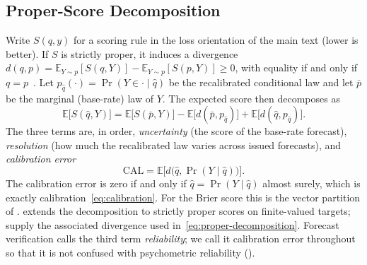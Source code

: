 \subsection{Proper-Score Decomposition}
Write $S(q,y)$ for a scoring rule in the loss orientation of the main text (lower is better).
If $S$ is strictly proper, it induces a divergence $d(q,p)=\mathbb{E}_{Y\sim p}[S(q,Y)]-\mathbb{E}_{Y\sim p}[S(p,Y)]\ge 0$, with equality if and only if $q=p$~\citep{gneiting2007strictly}.
Let $p_{\hat q}(\cdot)=\Pr(Y\in\cdot\mid\hat q)$ be the recalibrated conditional law and let $\bar p$ be the marginal (base-rate) law of $Y$.
The expected score then decomposes as
\begin{equation}
\label{eq:proper-decomposition}
\mathbb{E}\bigl[S(\hat q,Y)\bigr]
=
\mathbb{E}\bigl[S(\bar p,Y)\bigr]
-
\mathbb{E}\bigl[d(\bar p,p_{\hat q})\bigr]
+
\mathbb{E}\bigl[d(\hat q,p_{\hat q})\bigr].
\end{equation}
The three terms are, in order, \emph{uncertainty} (the score of the base-rate forecast), \emph{resolution} (how much the recalibrated law varies across issued forecasts), and \emph{calibration error}
\begin{equation}
\label{eq:calerror}
\mathrm{CAL}
=
\mathbb{E}\bigl[d\bigl(\hat q,\Pr(Y\mid\hat q)\bigr)\bigr].
\end{equation}
The calibration error is zero if and only if $\hat q=\Pr(Y\mid\hat q)$ almost surely, which is exactly calibration~\eqref{eq:calibration}.
For the Brier score this is the vector partition of \citet{murphy1973vector}.
\citet{brocker2009reliability} extends the decomposition to strictly proper scores on finite-valued targets;~\citet{gneiting2007strictly} supply the associated divergence used in~\eqref{eq:proper-decomposition}.
Forecast verification calls the third term \emph{reliability}; we call it calibration error throughout so that it is not confused with psychometric reliability ().

